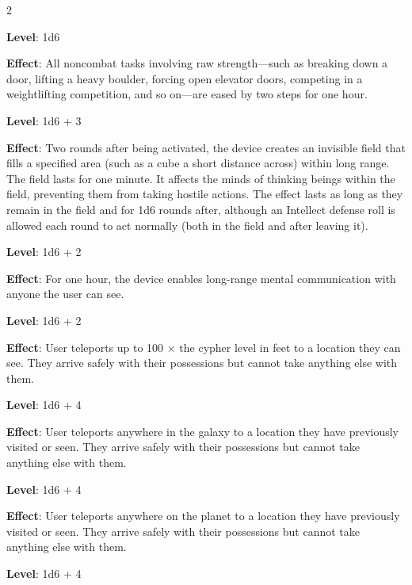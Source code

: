 \begin{multicols}{2}

\textbf{Level}: 1d6

\textbf{Effect}: All noncombat tasks involving raw strength—such as breaking down a door, lifting a heavy boulder, forcing open elevator doors, competing in a weightlifting competition, and so on—are eased by two steps for one hour.


\textbf{Level}: 1d6 + 3

\textbf{Effect}: Two rounds after being activated, the device creates an invisible field that fills a specified area (such as a cube a short distance across) within long range. The field lasts for one minute. It affects the minds of thinking beings within the field, preventing them from taking hostile actions. The effect lasts as long as they remain in the field and for 1d6 rounds after, although an Intellect defense roll is allowed each round to act normally (both in the field and after leaving it).


\textbf{Level}: 1d6 + 2

\textbf{Effect}: For one hour, the device enables long-range mental communication with anyone the user can see.


\textbf{Level}: 1d6 + 2

\textbf{Effect}: User teleports up to 100 × the cypher level in feet to a location they can see. They arrive safely with their possessions but cannot take anything else with them.


\textbf{Level}: 1d6 + 4

\textbf{Effect}: User teleports anywhere in the galaxy to a location they have previously visited or seen. They arrive safely with their possessions but cannot take anything else with them.


\textbf{Level}: 1d6 + 4

\textbf{Effect}: User teleports anywhere on the planet to a location they have previously visited or seen. They arrive safely with their possessions but cannot take anything else with them.


\textbf{Level}: 1d6 + 4


\end{multicols}
